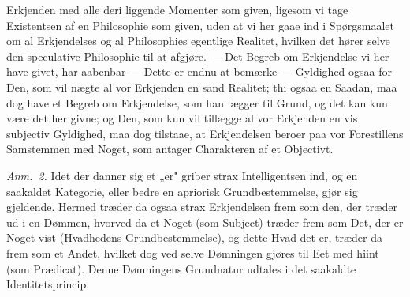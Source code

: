 \documentclass[12pt,a4paper]{book}
\begin{document}
{Erkjenden med alle deri liggende Momenter som given, ligesom vi tage Existentsen
af en Philosophie som given, uden at vi her gaae ind i Spørgsmaalet om al
Erkjendelses og al Philosophies egentlige Realitet, hvilken det hører selve den
speculative Philosophie til at afgjøre. --- Det Begreb om Erkjendelse vi her have
givet, har aabenbar --- Dette er endnu at bemærke --- Gyldighed ogsaa for Den,
som vil nægte al vor Erkjenden en sand Realitet; thi ogsaa en Saadan, maa dog
have et Begreb om Erkjendelse, som han lægger til Grund, og det kan kun være det
her givne; og Den, som kun vil tillægge al vor Erkjenden en vis subjectiv
Gyldighed, maa dog tilstaae, at Erkjendelsen beroer paa vor Forestillens
Samstemmen med Noget, som antager Charakteren af et Objectivt.\par}

{\small\emph{Anm.~2.} Idet der danner sig et „er" griber strax Intelligentsen
ind, og en saakaldet Kategorie, eller bedre en apriorisk Grundbestemmelse, gjør
sig gjeldende. Hermed træder da ogsaa strax Erkjendelsen frem som den, der træder
ud i en Dømmen, hvorved da et Noget (som Subject) træder frem som Det, der er
Noget vist (Hvadhedens Grundbestemmelse), og dette Hvad det er, træder da frem
som et Andet, hvilket dog ved selve Dømningen gjøres til Eet med hiint (som
Prædicat). Denne Dømningens Grundnatur udtales i det saakaldte
Identitetsprincip.\par}
\end{document}
